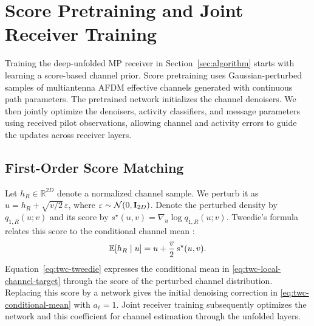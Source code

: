\section{Score Pretraining and Joint Receiver Training}
\label{sec:learning}

Training the deep-unfolded MP receiver in Section~\ref{sec:algorithm}
starts with learning a score-based channel prior. Score pretraining
uses Gaussian-perturbed samples of multiantenna AFDM effective
channels generated with continuous path parameters. The pretrained
network initializes the channel denoisers. We then jointly optimize
the denoisers, activity classifiers, and message parameters using
received pilot observations, allowing channel and activity errors
to guide the updates across receiver layers.

\subsection{First-Order Score Matching}

Let $h_R\in\mathbb R^{2D}$ denote a normalized channel sample.
We perturb it as $u=h_R+\sqrt{v/2}\,\varepsilon$, where
$\varepsilon\sim\mathcal N(0,\mathbf{I}_{2D})$. Denote the perturbed
density by $q_{1,R}(u;v)$ and its score by
$s^\star(u,v)=\nabla_u\log q_{1,R}(u;v)$.
Tweedie's formula relates this score to the conditional channel mean
\cite{efron2011,cai2026}:
\begin{equation}
 \mathbb{E}[h_R\mid u]=u+\frac v2\,s^\star(u,v).
 \label{eq:twc-tweedie}
\end{equation}
Equation~\eqref{eq:twc-tweedie} expresses the conditional mean in
\eqref{eq:twc-local-channel-target} through the score of the perturbed
channel distribution. Replacing this score by a network gives the initial denoising
correction in \eqref{eq:twc-conditional-mean} with $a_\ell=1$.
Joint receiver training subsequently optimizes the network and this
coefficient for channel estimation through the unfolded layers.

